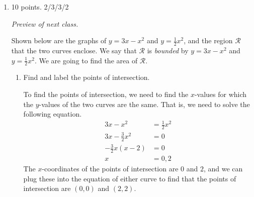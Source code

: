 \documentclass{article}
\begin{document}
\begin{enumerate}
\begin{enumerate}
    \end{enumerate}

    \pspace{\newpage}
\item 
\begin{grading}
10 points. 2/3/3/2
\end{grading}
 \emph{Preview of next class.}

Shown below are the graphs of $y=3x-x^2$ and $y=\tfrac{1}{2}x^2$, and the region $\mathcal{R}$ that the two curves enclose. We say that $\mathcal{R}$ is \emph{bounded} by $y=3x-x^2$ and $y=\tfrac{1}{2}x^2$. We are going to find the area of $\mathcal{R}$.

\begin{center}
\end{center}

\begin{enumerate}
    \item 
    \begin{problem}
        Find and label the points of intersection.
    \end{problem}
    \pspace{\vfill}

    \begin{solution}
        To find the points of intersection, we need to find the $x$-values for which the $y$-values of the two curves are the same. That is, we need to solve the following equation.
        \begin{align*}
            3x-x^2 &= \tfrac{1}{2}x^2 \\
            3x-\tfrac{3}{2}x^2 &= 0 \\
            -\tfrac{3}{2}x(x-2)&= 0 \\
            x&= 0, 2
        \end{align*}
        The $x$-coordinates of the points of intersection are $0$ and $2$, and we can plug these into the equation of either curve to find that the points of intersection are $(0, 0)$ and $(2, 2)$.
    \end{solution}


\end{enumerate}
\end{enumerate}
\end{document}
